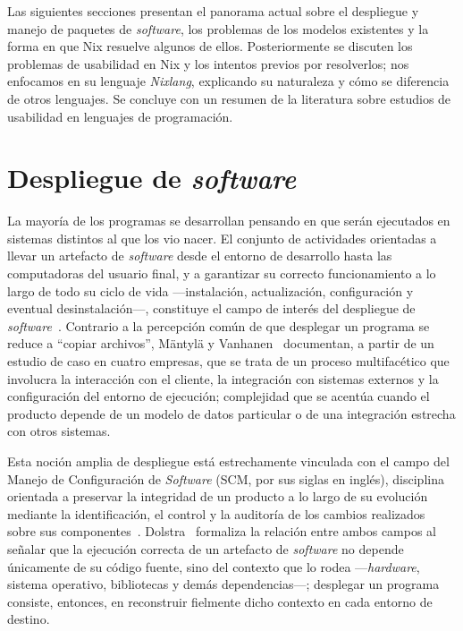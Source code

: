 Las siguientes secciones presentan el panorama actual sobre el despliegue y manejo de paquetes de \emph{software}, los problemas de los modelos existentes y la forma en que Nix resuelve algunos de ellos. Posteriormente se discuten los problemas de usabilidad en Nix y los intentos previos por resolverlos; nos enfocamos en su lenguaje \emph{Nixlang}, explicando su naturaleza y cómo se diferencia de otros lenguajes. Se concluye con un resumen de la literatura sobre estudios de usabilidad en lenguajes de programación.

\section{Despliegue de \emph{software}}

La mayoría de los programas se desarrollan pensando en que serán ejecutados en sistemas distintos al que los vio nacer. El conjunto de actividades orientadas a llevar un artefacto de \emph{software} desde el entorno de desarrollo hasta las computadoras del usuario final, y a garantizar su correcto funcionamiento a lo largo de todo su ciclo de vida ---instalación, actualización, configuración y eventual desinstalación---, constituye el campo de interés del despliegue de \emph{software}~\cite{mantylaSoftwareDeploymentActivities2011,Dolstra2006}. Contrario a la percepción común de que desplegar un programa se reduce a ``copiar archivos'', Mäntylä y Vanhanen~\cite{mantylaSoftwareDeploymentActivities2011} documentan, a partir de un estudio de caso en cuatro empresas, que se trata de un proceso multifacético que involucra la interacción con el cliente, la integración con sistemas externos y la configuración del entorno de ejecución; complejidad que se acentúa cuando el producto depende de un modelo de datos particular o de una integración estrecha con otros sistemas.

Esta noción amplia de despliegue está estrechamente vinculada con el campo del Manejo de Configuración de \emph{Software} (SCM, por sus siglas en inglés), disciplina orientada a preservar la integridad de un producto a lo largo de su evolución mediante la identificación, el control y la auditoría de los cambios realizados sobre sus componentes~\cite{bersoffSoftwareConfigurationManagement1978}. Dolstra~\cite{Dolstra2006} formaliza la relación entre ambos campos al señalar que la ejecución correcta de un artefacto de \emph{software} no depende únicamente de su código fuente, sino del contexto que lo rodea ---\emph{hardware}, sistema operativo, bibliotecas y demás dependencias---; desplegar un programa consiste, entonces, en reconstruir fielmente dicho contexto en cada entorno de destino.

